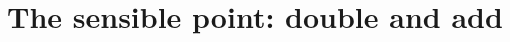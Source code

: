 \documentclass[journal]{IEEEtran}
\begin{document}
%
%


%




\section{The sensible point: double and add}
\end{document}
